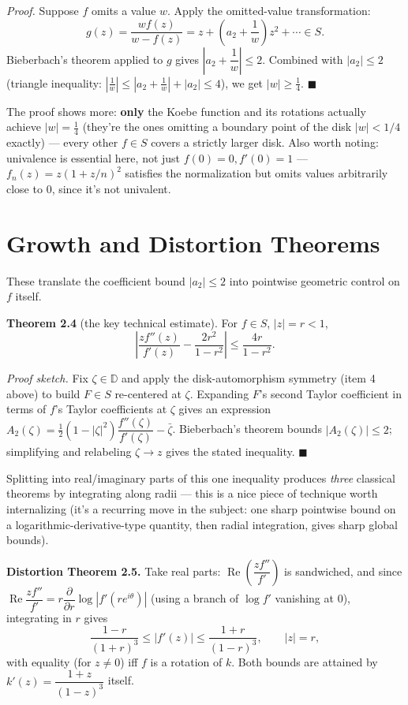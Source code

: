 \documentclass[
]{book}
\theoremstyle{definition}
\theoremstyle{definition}
\theoremstyle{definition}
\theoremstyle{definition}
\theoremstyle{remark}
\begin{document}
\emph{Proof.} Suppose \(f\) omits a value \(w\). Apply the omitted-value transformation:
\[g(z) = \frac{wf(z)}{w-f(z)} = z + \left(a_2+\frac1w\right)z^2+\cdots \in S.\]
Bieberbach's theorem applied to \(g\) gives \(\left|a_2+\dfrac1w\right|\le 2\). Combined with \(|a_2|\le 2\) (triangle inequality: \(\left|\frac1w\right| \le \left|a_2+\frac1w\right|+|a_2| \le 4\)), we get \(|w|\ge \tfrac14\). \(\blacksquare\)

The proof shows more: \textbf{only} the Koebe function and its rotations actually achieve \(|w|=\tfrac14\) (they're the ones omitting a boundary point of the disk \(|w|<1/4\) exactly) --- every other \(f\in S\) covers a strictly larger disk. Also worth noting: univalence is essential here, not just \(f(0)=0, f'(0)=1\) --- \(f_n(z) = z(1+z/n)^2\) satisfies the normalization but omits values arbitrarily close to \(0\), since it's not univalent.

\section{Growth and Distortion Theorems}\label{growth-and-distortion-theorems}

These translate the coefficient bound \(|a_2|\le2\) into pointwise geometric control on \(f\) itself.

\textbf{Theorem 2.4} (the key technical estimate). For \(f\in S\), \(|z|=r<1\),
\[\left|\frac{zf''(z)}{f'(z)} - \frac{2r^2}{1-r^2}\right| \le \frac{4r}{1-r^2}.\]

\emph{Proof sketch.} Fix \(\zeta\in\mathbb D\) and apply the disk-automorphism symmetry (item 4 above) to build \(F\in S\) re-centered at \(\zeta\). Expanding \(F\)'s second Taylor coefficient in terms of \(f\)'s Taylor coefficients at \(\zeta\) gives an expression \(A_2(\zeta) = \frac12(1-|\zeta|^2)\dfrac{f''(\zeta)}{f'(\zeta)} - \bar\zeta\). Bieberbach's theorem bounds \(|A_2(\zeta)|\le2\); simplifying and relabeling \(\zeta \to z\) gives the stated inequality. \(\blacksquare\)

Splitting into real/imaginary parts of this one inequality produces \emph{three} classical theorems by integrating along radii --- this is a nice piece of technique worth internalizing (it's a recurring move in the subject: one sharp pointwise bound on a logarithmic-derivative-type quantity, then radial integration, gives sharp global bounds).

\textbf{Distortion Theorem 2.5.} Take real parts: \(\operatorname{Re}\left(\dfrac{zf''}{f'}\right)\) is sandwiched, and since \(\operatorname{Re}\dfrac{zf''}{f'} = r\dfrac{\partial}{\partial r}\log|f'(re^{i\theta})|\) (using a branch of \(\log f'\) vanishing at \(0\)), integrating in \(r\) gives
\[\frac{1-r}{(1+r)^3} \le |f'(z)| \le \frac{1+r}{(1-r)^3}, \qquad |z|=r,\]
with equality (for \(z\ne0\)) iff \(f\) is a rotation of \(k\). Both bounds are attained by \(k'(z) = \dfrac{1+z}{(1-z)^3}\) itself.
\end{document}
